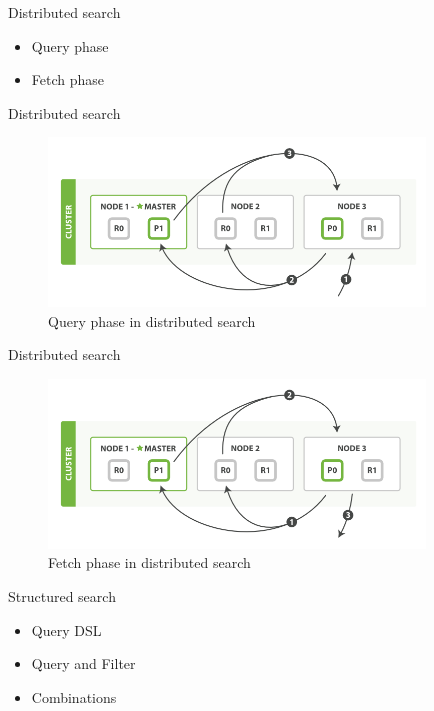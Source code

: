 \documentclass[10pt]{beamer}
\begin{document}
\begin{frame}{Distributed search}
	\begin{itemize}
		\item Query phase
		\item Fetch phase
	\end{itemize}
\end{frame}

\begin{frame}{Distributed search}
	\begin{figure}
		\centering\includegraphics[width=10cm]{query_phase}
		\caption{Query phase in distributed search}
	\end{figure}
\end{frame}

\begin{frame}{Distributed search}
	\begin{figure}
		\centering\includegraphics[width=10cm]{fetch_phase}
		\caption{Fetch phase in distributed search}
	\end{figure}
\end{frame}




\begin{frame}{Structured search}
	\begin{itemize}
		\item Query DSL
		\item Query and Filter
		\item Combinations
	\end{itemize}
\end{frame}
\end{document}
